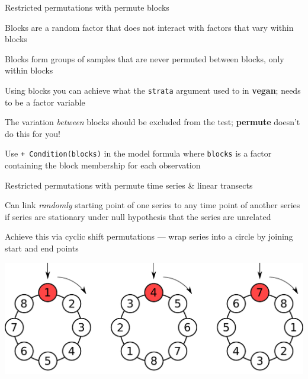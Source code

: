 \documentclass[10pt,ignorenonframetext,compress, aspectratio=169]{beamer}
\begin{document}
\begin{frame}{Restricted permutations with permute \textbar{} blocks}

Blocks are a random factor that does not interact with factors that vary
within blocks

Blocks form groups of samples that are never permuted between blocks,
only within blocks

Using blocks you can achieve what the \texttt{strata} argument used to
in \textbf{vegan}; needs to be a factor variable

The variation \emph{between} blocks should be excluded from the test;
\textbf{permute} doesn't do this for you!

Use \texttt{+\ Condition(blocks)} in the model formula where
\texttt{blocks} is a factor containing the block membership for each
observation

\end{frame}

\begin{frame}{Restricted permutations with permute \textbar{} time
series \& linear transects}

Can link \emph{randomly} starting point of one series to any time point
of another series if series are stationary under null hypothesis that
the series are unrelated

Achieve this via cyclic shift permutations --- wrap series into a circle
by joining start and end points

\includegraphics[width=\linewidth]{cyclic-shifts-figure}

\end{frame}
\end{document}
